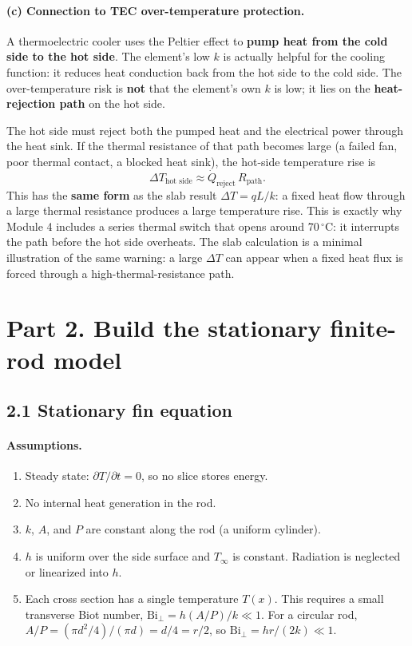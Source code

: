 \documentclass[reprint, amsmath, amssymb, aps, prl]{revtex4-2}
\newcommand{\Qdot}{\dot Q}
\newcommand{\degC}{\ensuremath{\,^\circ\mathrm{C}}}
\newcommand{\Biperp}{\mathrm{Bi}_\perp}
\begin{document}
\paragraph*{(c) Connection to TEC over-temperature protection.}
A thermoelectric cooler uses the Peltier effect to \textbf{pump heat from the cold side to
the hot side}. The element's low $k$ is actually helpful for the cooling function: it
reduces heat conduction back from the hot side to the cold side. The over-temperature
risk is \textbf{not} that the element's own $k$ is low; it lies on the
\textbf{heat-rejection path} on the hot side.

The hot side must reject both the pumped heat and the electrical power through the heat
sink. If the thermal resistance of that path becomes large (a failed fan, poor thermal
contact, a blocked heat sink), the hot-side temperature rise is
\begin{equation*}
\Delta T_{\text{hot side}}\approx\Qdot_{\text{reject}}\,R_{\text{path}}.
\end{equation*}
This has the \textbf{same form} as the slab result $\Delta T=qL/k$: a fixed heat flow
through a large thermal resistance produces a large temperature rise. This is exactly why
Module 4 includes a series thermal switch that opens around 70\degC: it interrupts the
path before the hot side overheats. The slab calculation is a minimal illustration of the
same warning: a large $\Delta T$ can appear when a fixed heat flux is forced through a
high-thermal-resistance path.

\section*{Part 2. Build the stationary finite-rod model}

\subsection*{2.1 Stationary fin equation}

\paragraph*{Assumptions.}
\begin{enumerate}
\item Steady state: $\partial T/\partial t=0$, so no slice stores energy.
\item No internal heat generation in the rod.
\item $k$, $A$, and $P$ are constant along the rod (a uniform cylinder).
\item $h$ is uniform over the side surface and $T_\infty$ is constant. Radiation is
neglected or linearized into $h$.
\item Each cross section has a single temperature $T(x)$. This requires a small transverse
Biot number, $\Biperp=h(A/P)/k\ll1$. For a circular rod,
$A/P=(\pi d^2/4)/(\pi d)=d/4=r/2$, so $\Biperp=hr/(2k)\ll1$.
\end{enumerate}
\end{document}
